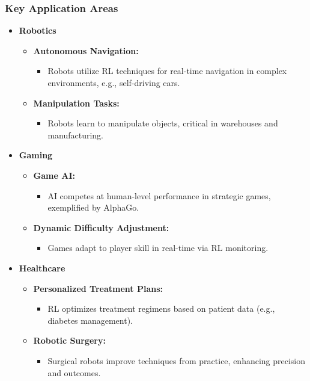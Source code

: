 \documentclass{beamer}
\begin{document}
\begin{frame}[fragile]
    \frametitle{Key Application Areas}
    \begin{itemize}
        \item \textbf{Robotics}
        \begin{itemize}
            \item \textbf{Autonomous Navigation:} 
            \begin{itemize}
                \item Robots utilize RL techniques for real-time navigation in complex environments, e.g., self-driving cars.
            \end{itemize}
            \item \textbf{Manipulation Tasks:} 
            \begin{itemize}
                \item Robots learn to manipulate objects, critical in warehouses and manufacturing.
            \end{itemize}
        \end{itemize}
        
        \item \textbf{Gaming}
        \begin{itemize}
            \item \textbf{Game AI:} 
            \begin{itemize}
                \item AI competes at human-level performance in strategic games, exemplified by AlphaGo.
            \end{itemize}
            \item \textbf{Dynamic Difficulty Adjustment:} 
            \begin{itemize}
                \item Games adapt to player skill in real-time via RL monitoring.
            \end{itemize}
        \end{itemize}
        
        \item \textbf{Healthcare}
        \begin{itemize}
            \item \textbf{Personalized Treatment Plans:} 
            \begin{itemize}
                \item RL optimizes treatment regimens based on patient data (e.g., diabetes management).
            \end{itemize}
            \item \textbf{Robotic Surgery:} 
            \begin{itemize}
                \item Surgical robots improve techniques from practice, enhancing precision and outcomes.
            \end{itemize}
        \end{itemize}
    \end{itemize}
\end{frame}
\end{document}
